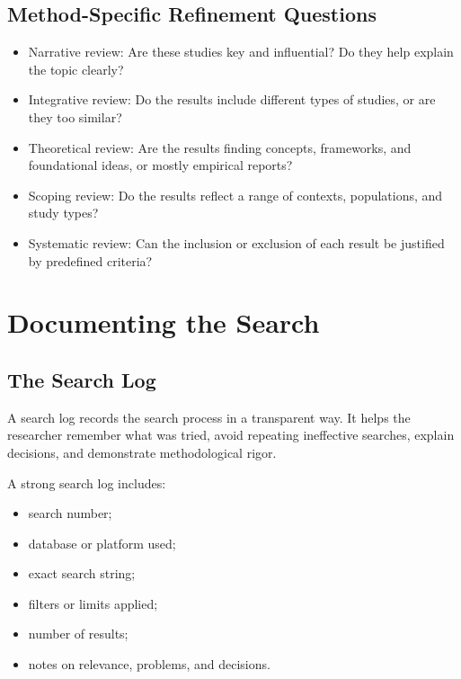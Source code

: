 \documentclass[11pt,letterpaper]{article}
\begin{document}
\subsection{Method-Specific Refinement Questions}

\begin{itemize}
  \item Narrative review: Are these studies key and influential? Do they help explain the topic clearly?
  \item Integrative review: Do the results include different types of studies, or are they too similar?
  \item Theoretical review: Are the results finding concepts, frameworks, and foundational ideas, or mostly empirical reports?
  \item Scoping review: Do the results reflect a range of contexts, populations, and study types?
  \item Systematic review: Can the inclusion or exclusion of each result be justified by predefined criteria?
\end{itemize}

\section{Documenting the Search}

\subsection{The Search Log}

A search log records the search process in a transparent way. It helps the researcher remember what was tried, avoid repeating ineffective searches, explain decisions, and demonstrate methodological rigor.

A strong search log includes:

\begin{itemize}
  \item search number;
  \item database or platform used;
  \item exact search string;
  \item filters or limits applied;
  \item number of results;
  \item notes on relevance, problems, and decisions.
\end{itemize}
\end{document}
